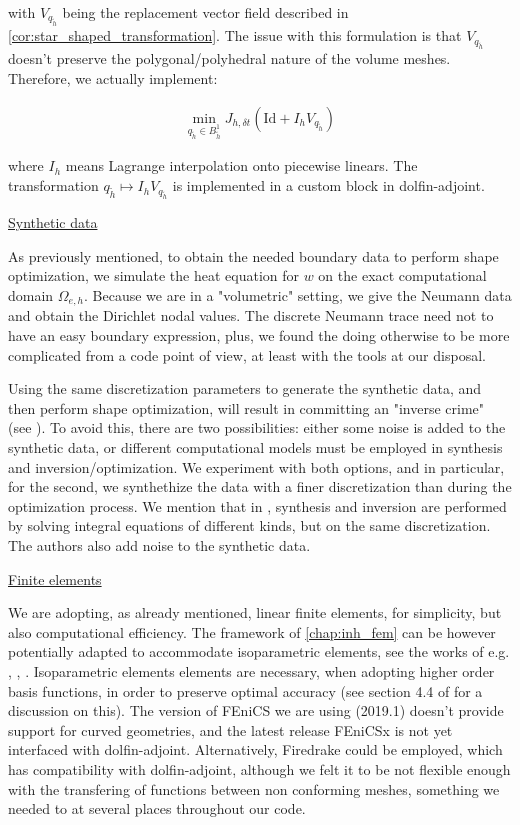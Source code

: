 \documentclass[english,a4paper,9pt,oneside]{scrbook}	%
\theoremstyle{break}
\theoremstyle{remark}
\newcommand{\id}{\text{Id}}
\begin{document}
with $V_{q_{\tilde{h}}}$ being the replacement vector field described in  \cref{cor:star_shaped_transformation}. The issue with this formulation is that  $V_{q_{\tilde{h}}}$ doesn't preserve the polygonal/polyhedral nature of the volume meshes. Therefore, we actually implement:

\begin{align*}
	\min_{q_{\tilde{h}} \in B^1_{\tilde{h}}}J_{h,\delta t }(\id  + I_h V_{q_{\tilde{h}}})
\end{align*}

where $I_h$ means Lagrange interpolation onto piecewise linears. The transformation $q_{\tilde{h}} \mapsto I_h V_{q_{\tilde{h}}}$ is implemented in a custom block in dolfin-adjoint.

\underline{Synthetic data}

As previously mentioned, to obtain the needed boundary data to perform shape optimization, we simulate the heat equation for $w$ on the exact computational domain $\Omega_{e,h}$. Because we are in a "volumetric" setting, we give the Neumann data and obtain the Dirichlet nodal values. The discrete Neumann trace need not to have an easy boundary expression, plus, we found the doing otherwise to be more complicated from a code point of view, at least with the tools at our disposal.

Using the same discretization parameters to generate the synthetic data, and then perform shape optimization, will result in committing an "inverse crime" (see \cite{wirgin}). To avoid this, there are two possibilities: either some noise is added to the synthetic data, or different computational models must be employed in synthesis and inversion/optimization. We experiment with both options, and in particular, for the second, we synthethize the data with a finer discretization than during the optimization process. We mention that in \cite{harbrecht}, synthesis and inversion are performed by solving integral equations of different kinds, but on the same discretization. The authors also add noise to the synthetic data.  

\underline{Finite elements}

We are adopting, as already mentioned, linear finite elements, for simplicity, but also computational efficiency. The framework of \cref{chap:inh_fem} can be however potentially adapted to accommodate isoparametric elements, see the works of e.g. \cite{edelmann}, \cite{elliott}, \cite{ranner}. Isoparametric elements elements are necessary, when adopting higher order basis functions, in order to preserve optimal accuracy (see section 4.4 of \cite{strang} for a discussion on this). The version of FEniCS we are using (2019.1) doesn't provide support for curved geometries, and the latest release FEniCSx is not yet interfaced with dolfin-adjoint. Alternatively, Firedrake could be employed, which has compatibility with dolfin-adjoint, although we felt it to be not flexible enough with the transfering of functions between non conforming meshes, something we needed to at several places throughout our code.
\end{document}
